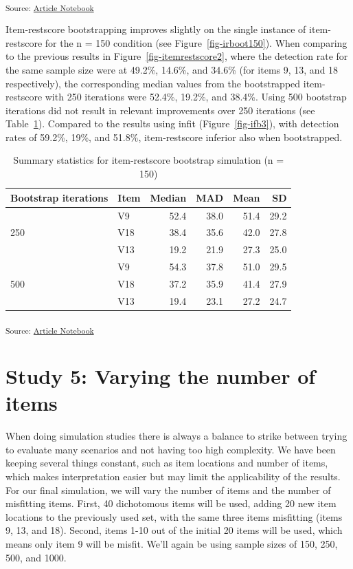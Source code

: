 \documentclass[
  letterpaper,
  DIV=11,
  numbers=noendperiod]{scrartcl}
\begin{document}
\textsubscript{Source:
\href{https://pgmj.github.io/rasch_itemfit/index.qmd.html}{Article
Notebook}}

Item-restscore bootstrapping improves slightly on the single instance of
item-restscore for the n = 150 condition (see
Figure~\ref{fig-irboot150}). When comparing to the previous results in
Figure~\ref{fig-itemrestscore2}, where the detection rate for the same
sample size were at 49.2\%, 14.6\%, and 34.6\% (for items 9, 13, and 18
respectively), the corresponding median values from the bootstrapped
item-restscore with 250 iterations were 52.4\%, 19.2\%, and 38.4\%.
Using 500 bootstrap iterations did not result in relevant improvements
over 250 iterations (see Table~\ref{tbl-irb150mis}). Compared to the
results using infit (Figure~\ref{fig-ifb3}), with detection rates of
59.2\%, 19\%, and 51.8\%, item-restscore inferior also when
bootstrapped.

\begin{longtable}[]{@{}llrrrr@{}}

\caption{\label{tbl-irb150mis}Summary statistics for item-restscore
bootstrap simulation (n = 150)}

\tabularnewline

\toprule\noalign{}
Bootstrap iterations & Item & Median & MAD & Mean & SD \\
\midrule\noalign{}
\endhead
\bottomrule\noalign{}
\endlastfoot
& V9 & 52.4 & 38.0 & 51.4 & 29.2 \\
250 & V18 & 38.4 & 35.6 & 42.0 & 27.8 \\
& V13 & 19.2 & 21.9 & 27.3 & 25.0 \\
& V9 & 54.3 & 37.8 & 51.0 & 29.5 \\
500 & V18 & 37.2 & 35.9 & 41.4 & 27.9 \\
& V13 & 19.4 & 23.1 & 27.2 & 24.7 \\

\end{longtable}

\textsubscript{Source:
\href{https://pgmj.github.io/rasch_itemfit/index.qmd.html}{Article
Notebook}}

\section{Study 5: Varying the number of
items}\label{study-5-varying-the-number-of-items}

When doing simulation studies there is always a balance to strike
between trying to evaluate many scenarios and not having too high
complexity. We have been keeping several things constant, such as item
locations and number of items, which makes interpretation easier but may
limit the applicability of the results. For our final simulation, we
will vary the number of items and the number of misfitting items. First,
40 dichotomous items will be used, adding 20 new item locations to the
previously used set, with the same three items misfitting (items 9, 13,
and 18). Second, items 1-10 out of the initial 20 items will be used,
which means only item 9 will be misfit. We'll again be using sample
sizes of 150, 250, 500, and 1000.
\end{document}
